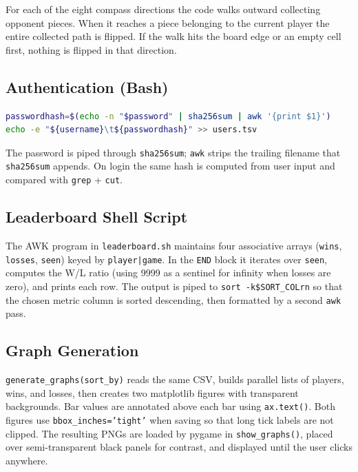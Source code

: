 \documentclass[12pt,a4paper]{article}
\begin{document}
For each of the eight compass directions the code walks outward collecting
opponent pieces. When it reaches a piece belonging to the current player the
entire collected path is flipped. If the walk hits the board edge or an empty
cell first, nothing is flipped in that direction.
 
\subsection{Authentication (Bash)}
 
\begin{lstlisting}[language=bash, caption={Password hashing in main.sh}]
passwordhash=$(echo -n "$password" | sha256sum | awk '{print $1}')
echo -e "${username}\t${passwordhash}" >> users.tsv
\end{lstlisting}
 
The password is piped through \texttt{sha256sum}; \texttt{awk} strips the
trailing filename that \texttt{sha256sum} appends. On login the same hash is
computed from user input and compared with \texttt{grep} + \texttt{cut}.
 
\subsection{Leaderboard Shell Script}
 
The AWK program in \texttt{leaderboard.sh} maintains four associative arrays
(\texttt{wins}, \texttt{losses}, \texttt{seen}) keyed by
\texttt{player|game}.
In the \texttt{END} block it iterates over \texttt{seen}, computes the W/L
ratio (using 9999 as a sentinel for infinity when losses are zero), and prints
each row. The output is piped to \texttt{sort -k\${SORT\_COL}rn} so that the
chosen metric column is sorted descending, then formatted by a second
\texttt{awk} pass.
 
\subsection{Graph Generation}
 
\texttt{generate\_graphs(sort\_by)} reads the same CSV, builds parallel lists of
players, wins, and losses, then creates two matplotlib figures with transparent
backgrounds. Bar values are annotated above each bar using \texttt{ax.text()}.
Both figures use \texttt{bbox\_inches='tight'} when saving so that long tick
labels are not clipped. The resulting PNGs are loaded by pygame in
\texttt{show\_graphs()}, placed over semi-transparent black panels for contrast,
and displayed until the user clicks anywhere.
 
\end{document}
